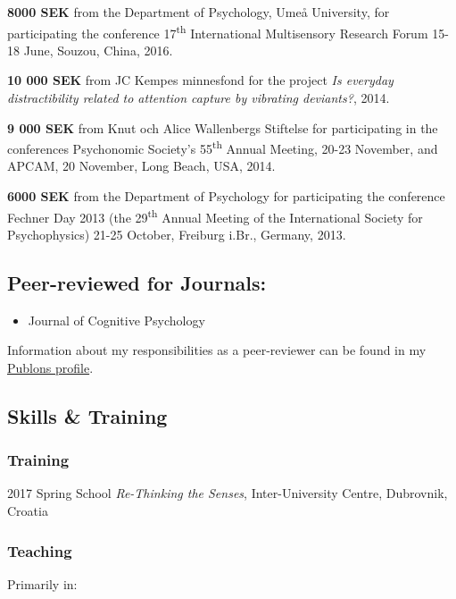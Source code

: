 \documentclass[]{article}
\providecommand{\tightlist}{%
  \setlength{\itemsep}{0pt}\setlength{\parskip}{0pt}}
\begin{document}
\textbf{8000 SEK} from the Department of Psychology, Umeå University,
for participating the conference 17\textsuperscript{th} International
Multisensory Research Forum 15-18 June, Souzou, China, 2016.

\textbf{10 000 SEK} from JC Kempes minnesfond for the project \emph{Is
everyday distractibility related to attention capture by vibrating
deviants?}, 2014.

\textbf{9 000 SEK} from Knut och Alice Wallenbergs Stiftelse for
participating in the conferences Psychonomic Society's
55\textsuperscript{th} Annual Meeting, 20-23 November, and APCAM, 20
November, Long Beach, USA, 2014.

\textbf{6000 SEK} from the Department of Psychology for participating
the conference Fechner Day 2013 (the 29\textsuperscript{th} Annual
Meeting of the International Society for Psychophysics) 21-25 October,
Freiburg i.Br., Germany, 2013.

\subsection{Peer-reviewed for
Journals:}\label{peer-reviewed-for-journals}

\begin{itemize}
\tightlist
\item
  Journal of Cognitive Psychology
\end{itemize}

Information about my responsibilities as a peer-reviewer can be found in
my \href{https://www.publons.com/a/1517052/}{Publons profile}.

\subsection{Skills \& Training}\label{skills-training}

\subsubsection{Training}\label{training}

2017 Spring School \emph{Re-Thinking the Senses}, Inter-University
Centre, Dubrovnik, Croatia

\subsubsection{Teaching}\label{teaching}

Primarily in:
\end{document}
